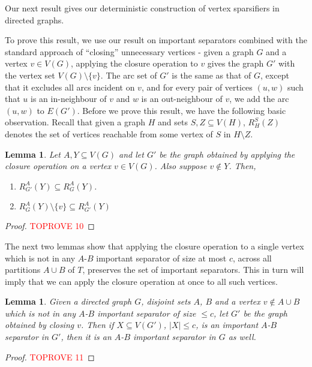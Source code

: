 \documentclass[11pt]{article}
\newtheorem{lemma}[theorem]{Lemma}
\begin{document}
{Our next result gives our deterministic construction of vertex sparsifiers in directed graphs.
\mimicking*


To prove this result, we use our result on important separators combined with the standard approach of ``closing'' unnecessary vertices - given a graph $G$ and a vertex $v \in V(G)$, applying the closure operation to $v$ gives the graph $G'$ with the vertex set $V(G) \setminus \{v\}$. The arc set of $G'$ is the same as that of $G$, except that it excludes all arcs incident on $v$, and for every pair of vertices $(u,w)$ such that $u$ is an in-neighbour of $v$ and $w$ is an out-neighbour of $v$,
we add the arc $(u,w)$ to $E(G')$. Before we prove this result, we have the following basic observation. Recall that given a graph $H$ and sets $S,Z \subseteq V(H)$, $R_H^S(Z)$ denotes the set of vertices reachable from some vertex of $S$ in $H \setminus Z$.

\begin{lemma}\label{lemma:closurereach}
Let $A,Y \subseteq V(G)$ and let $G'$ be the graph obtained by applying the closure operation on a vertex $v \in V(G)$. Also suppose $v \notin Y$. Then,

\begin{enumerate}
\item $R_{G'}^A(Y) \subseteq R^A_{G}(Y)$.
\item $R_G^A(Y) \setminus \{v\} \subseteq R^A_{G'}(Y)$ 


\end{enumerate}

\end{lemma}

\begin{proof}\textcolor{red}{TOPROVE 10}\end{proof}










The next two lemmas show that applying the closure operation to a single vertex which is not in any $A$-$B$ important separator of size at most $c$, across all partitions $A \cup B$ of $T$, preserves the set of important separators. This in turn will imply that we can apply the closure operation at once to all such vertices.  

\begin{lemma}\label{lemma:mimicking1}
Given a directed graph $G$, disjoint sets $A$, $B$ and a vertex $v \notin A \cup B$ which is not in any $A$-$B$ important separator of size $\leq c$, let $G'$ be the graph obtained by closing $v$. Then if $X \subseteq V(G')$, $|X| \leq c$, is an important $A$-$B$ separator in $G'$, then it is an $A$-$B$ important separator in $G$ as well.
\end{lemma}
\begin{proof}\textcolor{red}{TOPROVE 11}\end{proof}










}
\end{document}
